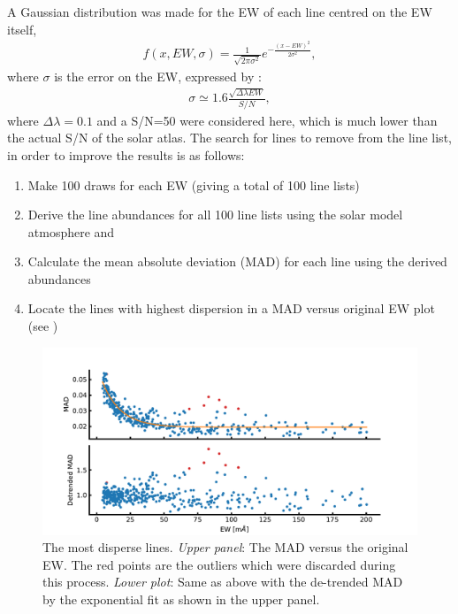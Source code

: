 A Gaussian distribution was made for the EW of each line centred on the EW itself,
\begin{align}
  f(x, EW, \sigma) = \frac{1}{\sqrt{2\pi\sigma^2}} e^{-\frac{(x-EW)^2}{2\sigma^2}},
\end{align}
where $\sigma$ is the error on the EW, expressed by \citet{Caryel1988}:
\begin{align}
  \sigma \simeq 1.6 \frac{\sqrt{\Delta\lambda EW}}{S/N},
\end{align}
where $\Delta\lambda=0.1$ and a S/N=50 were considered here, which is much lower than the actual S/N
of the solar atlas. The search for lines to remove from the line list, in order to improve the
results is as follows:
\begin{enumerate}
  \item Make 100 draws for each EW (giving a total of 100 line lists)
  \item Derive the line abundances for all 100 line lists using the solar model atmosphere and 
  \item Calculate the mean absolute deviation (MAD) for each line using the derived abundances
  \item Locate the lines with highest dispersion in a MAD versus original EW plot (see
        )
\end{enumerate}

\begin{figure}[htpb!]
    \centering
    \includegraphics[width=1.0\linewidth]{figures/disperse_lines.pdf}
    \caption{The most disperse lines.
             \emph{Upper panel}:
             The MAD versus the original EW. The red points are the outliers which were discarded
             during this process.
             \emph{Lower plot}:
             Same as above with the de-trended MAD  by the exponential fit as shown in the upper
             panel.}
    \label{fig:dispersive_lines}
\end{figure}

